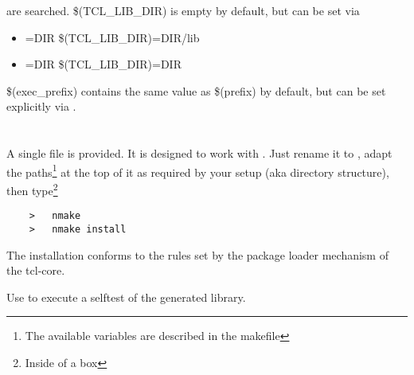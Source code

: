\begin {itemize}
	are searched. \$(TCL\_LIB\_DIR) is empty by default, but
	can be set via

	\begin {itemize}
	\item[]	=DIR	      \ra {} \$(TCL\_LIB\_DIR)=DIR/lib
	\item[]	=DIR \ra {} \$(TCL\_LIB\_DIR)=DIR
	\end {itemize}

	\$(exec\_prefix) contains the same value as \$(prefix) by
	default, but can be set explicitly via .
\end {itemize}



\section {\win{}}

A single file  is provided. It is designed to
work with . Just rename it to , adapt
the paths\footnote {The available variables are described in the
makefile} at the top of it as required by your setup (aka directory
structure), then type\footnote {Inside of a \dos {} box}

\begin{verbatim}
	>	nmake
	>	nmake install
\end{verbatim}


The installation conforms to the rules set by the package loader
mechanism of the tcl-core.

Use  to execute a selftest of the generated library.



